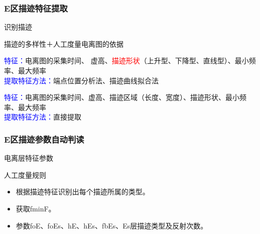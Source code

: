 \documentclass[notheorems,mathserif,table,compress]{beamer}  %
\begin{document}
\begin{frame}
\frametitle{ E区描迹特征提取}
\begin{tcolorbox}[colback=blue!5,colframe=blue!75!black]
\begin{description}
\vspace{-0.5em}
\addtolength{\itemindent}{-4em}
\item[目的] 识别描迹
\item[依据] 描迹的多样性＋人工度量电离图的依据
\vspace{-0.5em}
\end{description}
\end{tcolorbox}
\begin{tcolorbox}[colback=blue!5,colframe=blue!75!black,title=常规型描迹]
{\textcolor{blue}{特征：}}电离图的采集时间、 虚高、\textcolor{red}{描迹形状}（上升型、下降型、直线型）、最小频率、最大频率\\
{\textcolor{blue}{提取特征方法：}}端点位置分析法、描迹曲线拟合法



\end{tcolorbox}
\begin{tcolorbox}[colback=blue!5,colframe=blue!75!black,title=扩散型描迹]

{\textcolor{blue}{特征：}}电离图的采集时间、虚高、描迹区域（长度、宽度）、描迹形状、最小频率、最大频率\\
{\textcolor{blue}{提取特征方法：}}直接提取
\end{tcolorbox}
\end{frame}

\begin{frame}
\frametitle{ E区描迹参数自动判读}
\begin{tcolorbox}[colback=blue!5,colframe=blue!75!black]
\begin{description}
\vspace{-0.5em}
\addtolength{\itemindent}{-4em}
\item[目的] 电离层特征参数
\item[依据] 人工度量规则
\vspace{-0.5em}
\end{description}
\end{tcolorbox}
\begin{tcolorbox}[colback=blue!5,colframe=blue!75!black,title=参数判读]
\begin{itemize}
\item 根据描迹特征识别出每个描迹所属的类型。
\item 获取fminF。
\item 参数foE、foEs、hE、hEs、fbEs、Es层描迹类型及反射次数。
\end{itemize}
\end{tcolorbox}
\end{frame}
\end{document}
